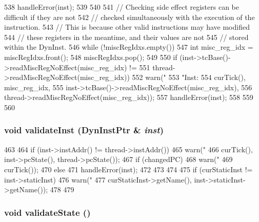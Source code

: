 \begin{DoxyCode}
{{538         handleError(inst);
539     }
540 
541     // Checking side effect registers can be difficult if they are not
542     // checked simultaneously with the execution of the instruction.
543     // This is because other valid instructions may have modified
544     // these registers in the meantime, and their values are not
545     // stored within the DynInst.
546     while (!miscRegIdxs.empty()) {
547         int misc_reg_idx = miscRegIdxs.front();
548         miscRegIdxs.pop();
549 
550         if (inst->tcBase()->readMiscRegNoEffect(misc_reg_idx) !=
551             thread->readMiscRegNoEffect(misc_reg_idx)) {
552             warn("%
553                  "Inst: %
554                  curTick(), misc_reg_idx,
555                  inst->tcBase()->readMiscRegNoEffect(misc_reg_idx),
556                  thread->readMiscRegNoEffect(misc_reg_idx));
557             handleError(inst);
558         }
559     }
560 }
\end{DoxyCode}
\hypertarget{classChecker_afacc503db5e7b6c0dd9925071a6f2732}{
\subsubsection[{validateInst}]{\setlength{\rightskip}{0pt plus 5cm}void validateInst ({\bf DynInstPtr} \& {\em inst})}}
\label{classChecker_afacc503db5e7b6c0dd9925071a6f2732}



\begin{DoxyCode}
463 {
464     if (inst->instAddr() != thread->instAddr()) {
465         warn("%
466              curTick(), inst->pcState(), thread->pcState());
467         if (changedPC) {
468             warn("%
469                  curTick());
470         } else {
471             handleError(inst);
472         }
473     }
474 
475     if (curStaticInst != inst->staticInst) {
476         warn("%
477                 curStaticInst->getName(), inst->staticInst->getName());
478     }
479 }
\end{DoxyCode}
\hypertarget{classChecker_ab6bf9488b2aaa90f5c6ca2491c852d30}{
\subsubsection[{validateState}]{\setlength{\rightskip}{0pt plus 5cm}void validateState ()}}
\label{classChecker_ab6bf9488b2aaa90f5c6ca2491c852d30}



